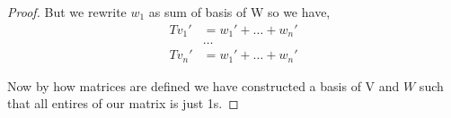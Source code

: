 \documentclass[a4paper]{report}
\begin{document}
\begin{proof}
    But we rewrite $w_1$ as sum of basis of W so we have, 
    \begin{align*}
        Tv_1' &= w_1' + \dots + w_n'\\
              &\dots\\
        Tv_n' &= w_1' + \dots + w_n'
    \end{align*}

    Now by how matrices are defined we have constructed a basis of V and $W$ such that all entires of our matrix is just 1s.



\end{proof}



    




\end{document}

